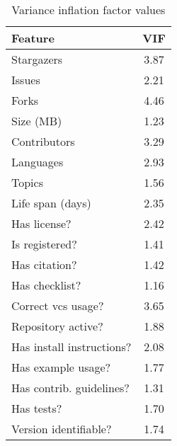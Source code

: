 \begin{table}[h!]
\footnotesize
\centering
\begin{tabular}{lc}
\toprule
                Feature &  VIF \\
\midrule
               Stargazers & 3.87 \\
                   Issues & 2.21 \\
                    Forks & 4.46 \\
                Size (MB) & 1.23 \\
             Contributors & 3.29 \\
                Languages & 2.93 \\
                   Topics & 1.56 \\
         Life span (days) & 2.35 \\
             Has license? & 2.42 \\
           Is registered? & 1.41 \\
            Has citation? & 1.42 \\
           Has checklist? & 1.16 \\
       Correct vcs usage? & 3.65 \\
       Repository active? & 1.88 \\
Has install instructions? & 2.08 \\
       Has example usage? & 1.77 \\
 Has contrib. guidelines? & 1.31 \\
               Has tests? & 1.70 \\
    Version identifiable? & 1.74 \\
\bottomrule
\end{tabular}
\caption{Variance inflation factor values}
\label{tab:vif}
\end{table}
